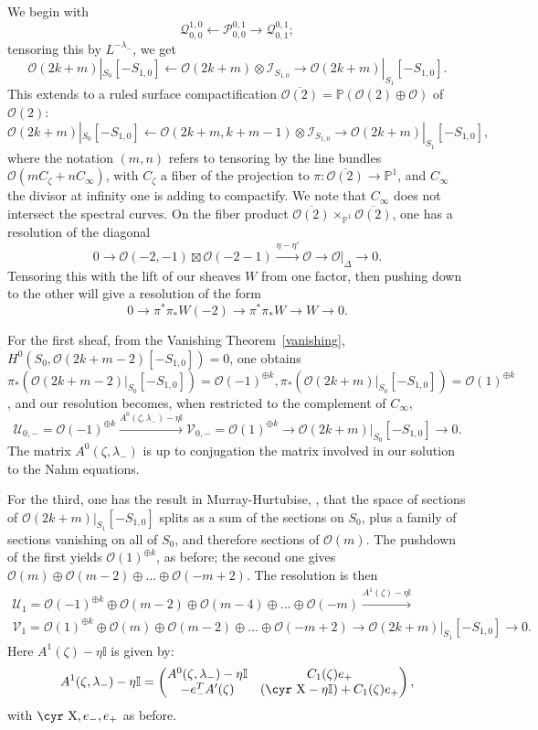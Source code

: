 \documentclass[12pt]{article}
\theoremstyle{definition}
\theoremstyle{remark}
\numberwithin{theorem}{section}
\newcommand{\Sh}{\hbox{\cyr X}}
\def\bP{{\mathbb {P}}}
\def\bI{{\mathbb {I}}}
\def\pI{{\mathcal I}}
\def\pO{{\mathcal O}}
\def\pP{{\mathcal P}}
\def\pQ{{\mathcal Q}}
\def\pU{{\mathcal U}}
\def\pV{{\mathcal V}}
\begin{document}
  We begin with 
 $$ \pQ_{0,0}^{ 1 ,0}\leftarrow \pP_{0,0}^{0 ,1}\rightarrow \pQ_{0,1}^{0 ,1};$$
 tensoring this by $L^{- \lambda_-}$, we get
 $$\pO(2k+m)|_{S_0}[-S_{1,0}] \leftarrow \pO(2k+m)\otimes \pI_{S_{1,0}}\rightarrow \pO(2k+m)|_{S_1}[-S_{1,0}].$$
This extends to  a ruled surface compactification $\overline{\pO(2)}= \bP(\pO(2)\oplus \pO)$ of $\pO(2)$:
  $$\pO(2k+m)|_{S_0}[-S_{1,0}] \leftarrow \pO(2k+m, k+m-1)\otimes \pI_{S_{1,0}}\rightarrow \pO(2k+m)|_{S_1}[-S_{1,0}],$$
 where the notation $(m,n)$ refers to tensoring by the line bundles $\pO(mC_\zeta + n C_\infty)$, with $C_\zeta$ a fiber of the projection to $\pi: \overline{\pO(2)}\rightarrow \bP^1$, and $C_\infty$ the divisor at infinity one is adding to compactify. We note that $C_\infty$ does not intersect the spectral curves. 
 On the fiber product $\overline{\pO(2)}\times_{\bP^1} \overline{\pO(2)}$, one has a resolution of the diagonal
 $$0\rightarrow   \pO(-2,-1)\boxtimes \pO(-2-1) \xrightarrow{\eta-\eta'} \pO \rightarrow \pO|_\Delta\rightarrow 0.$$
 Tensoring this with the lift of  our sheaves $W$ from one factor, then pushing down to the other will give a resolution of the form
 $$0\rightarrow \pi^*\pi_*W(-2) \rightarrow \pi^*\pi_*W \rightarrow W \rightarrow 0.$$
 
 For the first sheaf, from the Vanishing Theorem~\ref{vanishing}, $H^0(S_0, \pO(2k+m-2) [-S_{1,0}]) = 0$, one obtains $\pi_*( \pO(2k+m-2)|_{S_0} [-S_{1,0}])= \pO(-1)^{\oplus k}, \pi_*( \pO(2k+m)|_{S_0} [-S_{1,0}])= \pO(1)^{\oplus k}$, and our resolution becomes, when restricted to the complement of $C_\infty$,
 $$\pU_{0,-}=\pO(-1)^{\oplus k}\xrightarrow{ A^0(\zeta,\lambda_-)-\eta\bI} \pV_{0,-}= \pO(1)^{\oplus k} \rightarrow \pO(2k+m)|_{S_0}[-S_{1,0}]\rightarrow  0.$$
 The matrix $ A^0(\zeta,\lambda_-)$ is up to conjugation the matrix involved in our solution to the Nahm equations.
 
 For the third, one has the result in Murray-Hurtubise, \cite[Prop.~2.21]{HurtubiseMurray}, that the space of sections of $\pO(2k+m)|_{S_1}[-S_{1,0}]$ splits as a sum of the sections on $S_0$, plus a family of sections vanishing on all of $S_0$, and therefore sections of $\pO(m)$. The pushdown of the first yields  $\pO(1)^{\oplus k}$, as before; the second one gives $\pO(m) \oplus 
 \pO(m-2)\oplus...\oplus \pO(-m+2)$. The resolution is then 
\begin{multline*}
\pU_{1}= \pO(-1)^{\oplus k} \oplus \pO(m-2) \oplus 
 \pO(m-4 )\oplus...\oplus \pO(-m )\xrightarrow{  A^1(\zeta)-\eta\bI}  \\
\pV_{1}=  \pO(1)^{\oplus k}\oplus \pO(m) \oplus 
 \pO(m-2)\oplus...\oplus \pO(-m+2) \rightarrow \pO(2k+m)|_{S_1}[-S_{1,0}]\rightarrow  0.\end{multline*}
 Here $  A^1(\zeta)-\eta\bI$ is given by:
 $$A^1(\zeta,\lambda_-)-\eta\bI = \begin{pmatrix}  A^0(\zeta,\lambda_-)-\eta\bI& C_1(\zeta)e_+ \\ -e_-^T A'(\zeta) &(\Sh-\eta\bI) + C_1(\zeta)e_+  \end{pmatrix},$$
 with $\Sh, e_-, e_+$ as before.
 
\end{document}
